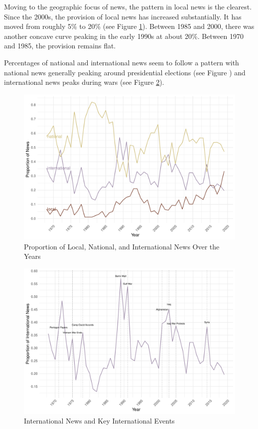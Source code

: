 \documentclass[12pt, letterpaper]{article}
\begin{document}


Moving to the geographic focus of news, the pattern in local news is the clearest. Since the 2000s, the provision of local news has increased substantially. It has moved from roughly 5\% to 20\% (see Figure \ref{fig:sub1_over_time}). Between 1985 and 2000, there was another concave curve peaking in the early 1990s at about 20\%. Between 1970 and 1985, the provision remains flat. 

Percentages of national and international news seem to follow a pattern with national news generally peaking around presidential elections (see Figure \citep{fig:national_president}) and international news peaks during wars (see Figure \ref{fig:international_war}).

\begin{figure}[H]
  \centering
  \caption{Proportion of Local, National, and International News Over the Years}
  \label{fig:sub1_over_time}
  \includegraphics[width=.95\linewidth]{../figs/fig_geography.pdf}
\end{figure}

\begin{figure}[H]
  \centering
  \caption{International News and Key International Events}
  \label{fig:international_war}
  \includegraphics[width=.95\linewidth]{../figs/fig_geography_wars.pdf}
\end{figure}
\end{document}
